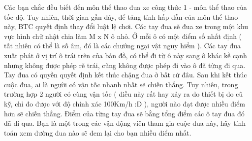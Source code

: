 Các bạn chắc đều biết đến môn thể thao đua xe công thức 1 - môn thể thao của tốc độ. Tuy nhiên, thời gian gần đây, để tăng tính hấp dẫn của môn thể thao này, BTC quyết định thay đổi luật lệ chơi. Các tay đua sẽ đua xe trong một khu vực hình chữ nhật chia làm M x N ô nhỏ. Ở mỗi ô có một điểm số nhất định ( tất nhiên có thể là số âm, đó là các chướng ngại vật nguy hiểm ). Các tay đua xuất phát ở vị trí ô trái trên của bản đồ, có thể đi từ ô này sang ô khác kề cạnh nhưng không được phép rẽ trái, cũng không được phép đi vào ô đã từng đi qua. Tay đua có quyền quyết định kết thúc chặng đua ở bất cứ đâu. Sau khi kết thúc cuộc đua, ai là người có vận tốc nhanh nhất sẽ chiến thắng. Tuy nhiên, trong trường hợp 2 người có cùng vận tốc ( điều này rất hay xảy ra do thiết bị đo cũ kỹ, chỉ đo được với độ chính xác 100Km/h :D ), người nào đạt được nhiều điểm hơn sẽ chiến thắng. Điểm của từng tay đua sẽ bằng tổng điểm các ô tay đua đó đã đi qua. Bạn là một trong các vận động viên tham gia cuộc đua này, hãy tính toán xem đường đua nào sẽ đem lại cho bạn nhiều điểm nhất.  

\
